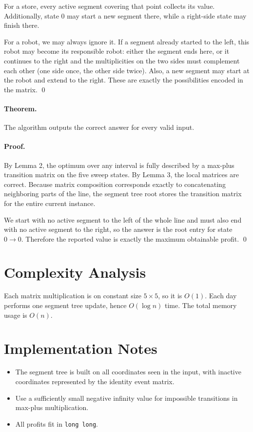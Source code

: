 \documentclass[11pt]{article}
\begin{document}
For a store, every active segment covering that point collects its value. Additionally, state $0$ may start a new segment there, while a right-side state may finish there.

For a robot, we may always ignore it. If a segment already started to the left, this robot may become its responsible robot: either the segment ends here, or it continues to the right and the multiplicities on the two sides must complement each other (one side once, the other side twice). Also, a new segment may start at the robot and extend to the right. These are exactly the possibilities encoded in the matrix. \qed

\paragraph{Theorem.}
The algorithm outputs the correct answer for every valid input.

\paragraph{Proof.}
By Lemma 2, the optimum over any interval is fully described by a max-plus transition matrix on the five sweep states. By Lemma 3, the local matrices are correct. Because matrix composition corresponds exactly to concatenating neighboring parts of the line, the segment tree root stores the transition matrix for the entire current instance.

We start with no active segment to the left of the whole line and must also end with no active segment to the right, so the answer is the root entry for state $0 \to 0$. Therefore the reported value is exactly the maximum obtainable profit. \qed

\section*{Complexity Analysis}

Each matrix multiplication is on constant size $5 \times 5$, so it is $O(1)$. Each day performs one segment tree update, hence $O(\log n)$ time. The total memory usage is $O(n)$.

\section*{Implementation Notes}

\begin{itemize}[leftmargin=*]
    \item The segment tree is built on all coordinates seen in the input, with inactive coordinates represented by the identity event matrix.
    \item Use a sufficiently small negative infinity value for impossible transitions in max-plus multiplication.
    \item All profits fit in \texttt{long long}.
\end{itemize}
\end{document}
